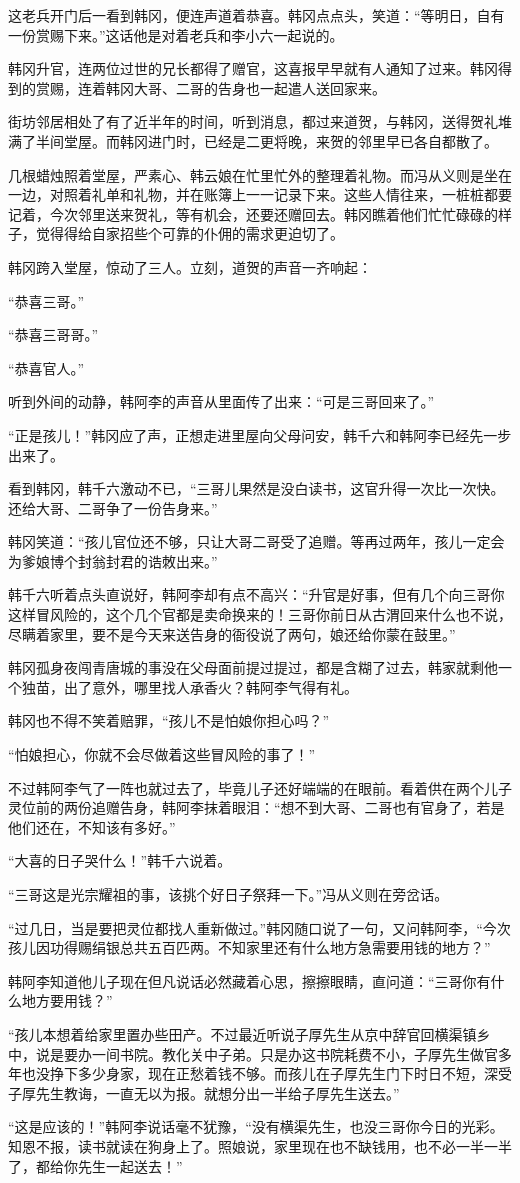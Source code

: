 这老兵开门后一看到韩冈，便连声道着恭喜。韩冈点点头，笑道：“等明日，自有一份赏赐下来。”这话他是对着老兵和李小六一起说的。

韩冈升官，连两位过世的兄长都得了赠官，这喜报早早就有人通知了过来。韩冈得到的赏赐，连着韩冈大哥、二哥的告身也一起遣人送回家来。

街坊邻居相处了有了近半年的时间，听到消息，都过来道贺，与韩冈，送得贺礼堆满了半间堂屋。而韩冈进门时，已经是二更将晚，来贺的邻里早已各自都散了。

几根蜡烛照着堂屋，严素心、韩云娘在忙里忙外的整理着礼物。而冯从义则是坐在一边，对照着礼单和礼物，并在账簿上一一记录下来。这些人情往来，一桩桩都要记着，今次邻里送来贺礼，等有机会，还要还赠回去。韩冈瞧着他们忙忙碌碌的样子，觉得得给自家招些个可靠的仆佣的需求更迫切了。

韩冈跨入堂屋，惊动了三人。立刻，道贺的声音一齐响起：

“恭喜三哥。”

“恭喜三哥哥。”

“恭喜官人。”

听到外间的动静，韩阿李的声音从里面传了出来：“可是三哥回来了。”

“正是孩儿！”韩冈应了声，正想走进里屋向父母问安，韩千六和韩阿李已经先一步出来了。

看到韩冈，韩千六激动不已，“三哥儿果然是没白读书，这官升得一次比一次快。还给大哥、二哥争了一份告身来。”

韩冈笑道：“孩儿官位还不够，只让大哥二哥受了追赠。等再过两年，孩儿一定会为爹娘博个封翁封君的诰敇出来。”

韩千六听着点头直说好，韩阿李却有点不高兴：“升官是好事，但有几个向三哥你这样冒风险的，这个几个官都是卖命换来的！三哥你前日从古渭回来什么也不说，尽瞒着家里，要不是今天来送告身的衙役说了两句，娘还给你蒙在鼓里。”

韩冈孤身夜闯青唐城的事没在父母面前提过提过，都是含糊了过去，韩家就剩他一个独苗，出了意外，哪里找人承香火？韩阿李气得有礼。

韩冈也不得不笑着赔罪，“孩儿不是怕娘你担心吗？”

“怕娘担心，你就不会尽做着这些冒风险的事了！”

不过韩阿李气了一阵也就过去了，毕竟儿子还好端端的在眼前。看着供在两个儿子灵位前的两份追赠告身，韩阿李抹着眼泪：“想不到大哥、二哥也有官身了，若是他们还在，不知该有多好。”

“大喜的日子哭什么！”韩千六说着。

“三哥这是光宗耀祖的事，该挑个好日子祭拜一下。”冯从义则在旁岔话。

“过几日，当是要把灵位都找人重新做过。”韩冈随口说了一句，又问韩阿李，“今次孩儿因功得赐绢银总共五百匹两。不知家里还有什么地方急需要用钱的地方？”

韩阿李知道他儿子现在但凡说话必然藏着心思，擦擦眼睛，直问道：“三哥你有什么地方要用钱？”

“孩儿本想着给家里置办些田产。不过最近听说子厚先生从京中辞官回横渠镇乡中，说是要办一间书院。教化关中子弟。只是办这书院耗费不小，子厚先生做官多年也没挣下多少身家，现在正愁着钱不够。而孩儿在子厚先生门下时日不短，深受子厚先生教诲，一直无以为报。就想分出一半给子厚先生送去。”

“这是应该的！”韩阿李说话毫不犹豫，“没有横渠先生，也没三哥你今日的光彩。知恩不报，读书就读在狗身上了。照娘说，家里现在也不缺钱用，也不必一半一半了，都给你先生一起送去！”

